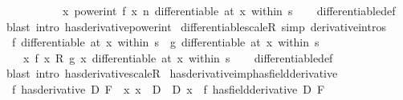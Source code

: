 \begin{isabellebody}
\ \ \ \ \ \ \ \ \ \ \ {\isacharparenleft}{\kern0pt}{\isasymlambda}x{\isachardot}{\kern0pt}\ power{\isacharunderscore}{\kern0pt}int\ {\isacharparenleft}{\kern0pt}f\ x{\isacharparenright}{\kern0pt}\ n{\isacharparenright}{\kern0pt}\ differentiable\ {\isacharparenleft}{\kern0pt}at\ x\ within\ s{\isacharparenright}{\kern0pt}{\isachardoublequoteclose}\isanewline
%
\isadelimproof
\ \ %
\endisadelimproof
%
\isatagproof
{}\isamarkupfalse%
\ differentiable{\isacharunderscore}{\kern0pt}def\ \isamarkupfalse%
\ {\isacharparenleft}{\kern0pt}blast\ intro{\isacharcolon}{\kern0pt}\ has{\isacharunderscore}{\kern0pt}derivative{\isacharunderscore}{\kern0pt}power{\isacharunderscore}{\kern0pt}int{\isacharparenright}{\kern0pt}%
\endisatagproof
{\isafoldproof}%
%
\isadelimproof
\isanewline
%
\endisadelimproof
\isanewline
{}\isamarkupfalse%
\ differentiable{\isacharunderscore}{\kern0pt}scaleR\ {\isacharbrackleft}{\kern0pt}simp{\isacharcomma}{\kern0pt}\ derivative{\isacharunderscore}{\kern0pt}intros{\isacharbrackright}{\kern0pt}{\isacharcolon}{\kern0pt}\isanewline
\ \ {\isachardoublequoteopen}f\ differentiable\ {\isacharparenleft}{\kern0pt}at\ x\ within\ s{\isacharparenright}{\kern0pt}\ {\isasymLongrightarrow}\ g\ differentiable\ {\isacharparenleft}{\kern0pt}at\ x\ within\ s{\isacharparenright}{\kern0pt}\ {\isasymLongrightarrow}\isanewline
\ \ \ \ {\isacharparenleft}{\kern0pt}{\isasymlambda}x{\isachardot}{\kern0pt}\ f\ x\ {\isacharasterisk}{\kern0pt}\isactrlsub R\ g\ x{\isacharparenright}{\kern0pt}\ differentiable\ {\isacharparenleft}{\kern0pt}at\ x\ within\ s{\isacharparenright}{\kern0pt}{\isachardoublequoteclose}\isanewline
%
\isadelimproof
\ \ %
\endisadelimproof
%
\isatagproof
{}\isamarkupfalse%
\ differentiable{\isacharunderscore}{\kern0pt}def\ \isamarkupfalse%
\ {\isacharparenleft}{\kern0pt}blast\ intro{\isacharcolon}{\kern0pt}\ has{\isacharunderscore}{\kern0pt}derivative{\isacharunderscore}{\kern0pt}scaleR{\isacharparenright}{\kern0pt}%
\endisatagproof
{\isafoldproof}%
%
\isadelimproof
\isanewline
%
\endisadelimproof
\isanewline
{}\isamarkupfalse%
\ has{\isacharunderscore}{\kern0pt}derivative{\isacharunderscore}{\kern0pt}imp{\isacharunderscore}{\kern0pt}has{\isacharunderscore}{\kern0pt}field{\isacharunderscore}{\kern0pt}derivative{\isacharcolon}{\kern0pt}\isanewline
\ \ {\isachardoublequoteopen}{\isacharparenleft}{\kern0pt}f\ has{\isacharunderscore}{\kern0pt}derivative\ D{\isacharparenright}{\kern0pt}\ F\ {\isasymLongrightarrow}\ {\isacharparenleft}{\kern0pt}{\isasymAnd}x{\isachardot}{\kern0pt}\ x\ {\isacharasterisk}{\kern0pt}\ D{\isacharprime}{\kern0pt}\ {\isacharequal}{\kern0pt}\ D\ x{\isacharparenright}{\kern0pt}\ {\isasymLongrightarrow}\ {\isacharparenleft}{\kern0pt}f\ has{\isacharunderscore}{\kern0pt}field{\isacharunderscore}{\kern0pt}derivative\ D{\isacharprime}{\kern0pt}{\isacharparenright}{\kern0pt}\ F{\isachardoublequoteclose}\isanewline

\end{isabellebody}
